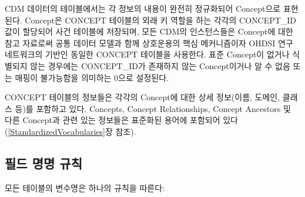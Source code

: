 \documentclass[11pt]{book}
\theoremstyle{definition}
\theoremstyle{definition}
\theoremstyle{definition}
\theoremstyle{remark}
\begin{document}
CDM 데이터의 테이블에서는 각 정보의 내용이 완전히 정규화되어 Concept으로
표현된다. Concept은 CONCEPT 테이블의 외래 키 역할을 하는 각각의
CONCEPT\_ID 값이 할당되어 사건 테이블에 저장되며, 모든 CDM의
인스턴스들은 Concept에 대한 참고 자료로써 공통 데이터 모델과 함께
상호운용의 핵심 메커니즘이자 OHDSI 연구 네트워크의 기반인 동일한 CONCEPT
테이블을 사용한다. 표준 Concept이 없거나 식별되지 않는 경우에는
CONCEPT\_ID가 존재하지 않는 Concept이거나 알 수 없음 또는 매핑이
불가능함을 의미하는 0으로 설정된다.

CONCEPT 테이블의 정보들은 각각의 Concept에 대한 상세 정보(이름, 도메인,
클래스 등)를 포함하고 있다. Concepts, Concept Relationships, Concept
Ancestors 및 다른 Concept과 관련 있는 정보들은 표준화된 용어에 포함되어
있다(\ref{StandardizedVocabularies}장 참조).

\subsection{필드 명명 규칙}\label{--}

모든 테이블의 변수명은 하나의 규칙을 따른다:
\end{document}
